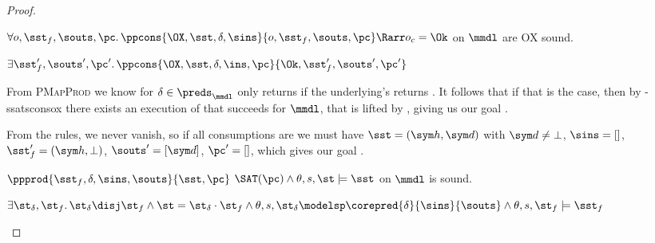 \begin{proof}

\pfassume \begin{hypvlist}
 $\forall o, \sst_f,\souts,\pc \ldotp \ppcons{\OX,\sst,\delta,\sins}{o, \sst_f, \souts, \pc}\Rarr o_c = \Ok$
 \consume{} on $\mmdl$ are OX sound.
\end{hypvlist}
\pfprove \begin{goalvlist}
 $\exists  \sst_f',\souts',\pc' \ldotp \ppcons{\OX, \sst, \delta,\ins,\pc}{\Ok, \sst_f', \souts', \pc'}$
\end{goalvlist}

\pfcase{$\delta \in \preds_\mmdl$}

From \textsc{PMapProd} we know \consume{} for $\delta\in\preds_\mmdl$ only returns \Ok{} if the underlying's \consume{} returns \Ok. It follows that if that is the case, then by \hyp{ssatsconsox} there exists an execution of \consume{} that succeeds for $\mmdl$, that is lifted by \PMap, giving us our goal .

\pfcase{$\delta = \domainset$}

From the \consume{} rules, we never vanish, so if all consumptions are \Ok{} we must have $\sst=(\sym h,\sym d)$ with $\sym d\neq\bot$, $\sins=[]$, $\sst'_f=(\sym h,\bot)$, $\souts'=[\sym d]$, $\pc'=[]$, which gives our goal .


\pfassume \begin{hypvlist}
 $\ppprod{\sst_f,\delta,\sins,\souts}{\sst, \pc}$
 $\SAT(\pc) \land \theta,s,\st\models\sst$
 \produce{} on $\mmdl$ is sound.
\end{hypvlist}
\pfprove \begin{goalvlist}
 $\exists \st_\delta, \st_f\ldotp \st_\delta\disj\st_f \land \st=\st_\delta\cdot\st_f \land \theta,s,\st_\delta \modelsp \corepred{\delta}{\sins}{\souts} \land \theta,s,\st_f \models \sst_f$
\end{goalvlist}

\pfcase{$\delta \in \preds_\mmdl$}


\end{proof}
